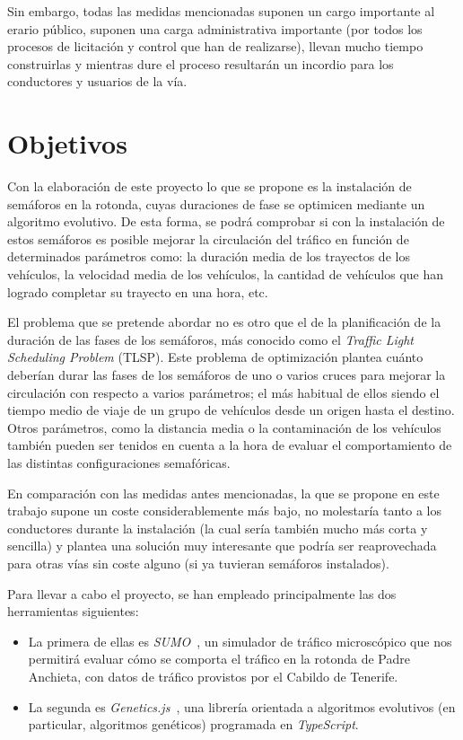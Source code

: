 Sin embargo, todas las medidas mencionadas suponen un cargo importante al erario público, suponen una carga administrativa importante (por todos los procesos de licitación y control que han de realizarse), llevan mucho tiempo construirlas y mientras dure el proceso resultarán un incordio para los conductores y usuarios de la vía.


\section{Objetivos}

Con la elaboración de este proyecto lo que se propone es la instalación de semáforos en la rotonda, cuyas duraciones de fase se optimicen mediante un algoritmo evolutivo. De esta forma, se podrá comprobar si con la instalación de estos semáforos es posible mejorar la circulación del tráfico en función de determinados parámetros como: la duración media de los trayectos de los vehículos, la velocidad media de los vehículos, la cantidad de vehículos que han logrado completar su trayecto en una hora, etc.

El problema que se pretende abordar no es otro que el de la planificación de la duración de las fases de los semáforos, más conocido como el \textit{Traffic Light Scheduling Problem} (TLSP). Este problema de optimización plantea cuánto deberían durar las fases de los semáforos de uno o varios cruces para mejorar la circulación con respecto a varios parámetros; el más habitual de ellos siendo el tiempo medio de viaje de un grupo de vehículos desde un origen hasta el destino. Otros parámetros, como la distancia media o la contaminación de los vehículos también pueden ser tenidos en cuenta a la hora de evaluar el comportamiento de las distintas configuraciones semafóricas.

En comparación con las medidas antes mencionadas, la que se propone en este trabajo supone un coste considerablemente más bajo, no molestaría tanto a los conductores durante la instalación (la cual sería también mucho más corta y sencilla) y plantea una solución muy interesante que podría ser reaprovechada para otras vías sin coste alguno (si ya tuvieran semáforos instalados).

Para llevar a cabo el proyecto, se han empleado principalmente las dos herramientas siguientes:

\begin{itemize}
    \item La primera de ellas es \textit{SUMO}~\cite{lopez_microscopic_2018}, un simulador de tráfico microscópico que nos permitirá evaluar cómo se comporta el tráfico en la rotonda de Padre Anchieta, con datos de tráfico provistos por el Cabildo de Tenerife.
    \item La segunda es \textit{Genetics.js}~\cite{abrante_dorta_framework_2019}, una librería orientada a algoritmos evolutivos (en particular, algoritmos genéticos) programada en \textit{TypeScript}.
\end{itemize}


